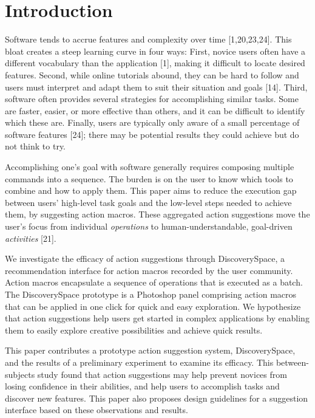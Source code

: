 \section{Introduction}
Software tends to accrue features and complexity over time [1,20,23,24]. This bloat creates a steep learning curve in four ways: First, novice users often have a different vocabulary than the application [1], making it difficult to locate desired features. Second, while online tutorials abound, they can be hard to follow and users must interpret and adapt them to suit their situation and goals [14]. Third, software often provides several strategies for accomplishing similar tasks. Some are faster, easier, or more effective than others, and it can be difficult to identify which these are. Finally, users are typically only aware of a small percentage of software features [24]; there may be potential results they could achieve but do not think to try.

Accomplishing one's goal with software generally requires composing multiple commands into a sequence. The burden is on the user to know which tools to combine and how to apply them. This paper aims to reduce the execution gap between users' high-level task goals and the low-level steps needed to achieve them, by suggesting action macros. These aggregated action suggestions move the user's focus from individual \textit{operations} to human-understandable, goal-driven \textit{activities} [21].

We investigate the efficacy of action suggestions through Discovery\-Space, a recommendation interface for action macros recorded by the user community. Action macros encapsulate a sequence of operations that is executed as a batch. The Discovery\-Space prototype is a Photoshop panel comprising action macros that can be applied in one click for quick and easy exploration. We hypothesize that action suggestions help users get started in complex applications by enabling them to easily explore creative possibilities and achieve quick results.

This paper contributes a prototype action suggestion system, Discovery\-Space, and the results of a preliminary experiment to examine its efficacy. This between-subjects study found that action suggestions may help prevent novices from losing confidence in their abilities, and help users to accomplish tasks and discover new features. This paper also proposes design guidelines for a suggestion interface based on these observations and results.
